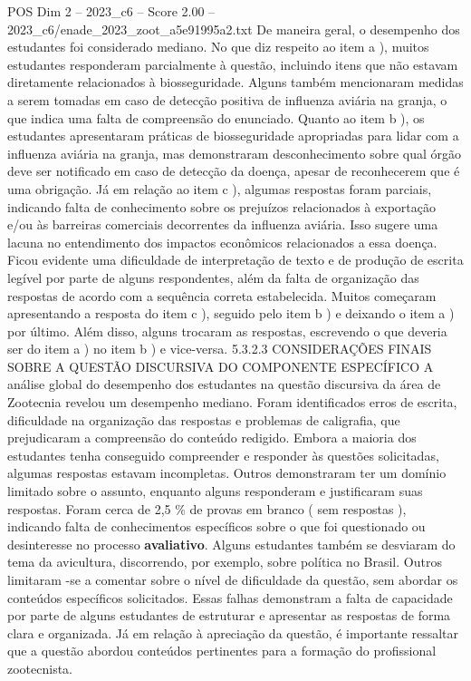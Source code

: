 \begin{textsample}{POS Dim 2 – 2023\_c6 – Score 2.00 – 2023\_c6/enade\_2023\_zoot\_a5e91995a2.txt}
De maneira geral, o desempenho dos estudantes foi considerado mediano.
No que diz respeito ao item a ), muitos estudantes responderam parcialmente à questão, incluindo itens que não estavam diretamente relacionados à biosseguridade.
Alguns também mencionaram medidas a serem tomadas em caso de detecção positiva de influenza aviária na granja, o que indica uma falta de compreensão do enunciado.
Quanto ao item b ), os estudantes apresentaram práticas de biosseguridade apropriadas para lidar com a influenza aviária na granja, mas demonstraram desconhecimento sobre qual órgão deve ser notificado em caso de detecção da doença, apesar de reconhecerem que é uma obrigação.
Já em relação ao item c ), algumas respostas foram parciais, indicando falta de conhecimento sobre os prejuízos relacionados à exportação e/ou às barreiras comerciais decorrentes da influenza aviária.
Isso sugere uma lacuna no entendimento dos impactos econômicos relacionados a essa doença.
Ficou evidente uma dificuldade de interpretação de texto e de produção de escrita legível por parte de alguns respondentes, além da falta de organização das respostas de acordo com a sequência correta estabelecida.
Muitos começaram apresentando a resposta do item c ), seguido pelo item b ) e deixando o item a ) por último.
Além disso, alguns trocaram as respostas, escrevendo o que deveria ser do item a ) no item b ) e vice-versa. 5.3.2.3 CONSIDERAÇÕES FINAIS SOBRE A QUESTÃO DISCURSIVA DO COMPONENTE ESPECÍFICO A análise global do desempenho dos estudantes na questão discursiva da área de Zootecnia revelou um desempenho mediano.
Foram identificados erros de escrita, dificuldade na organização das respostas e problemas de caligrafia, que prejudicaram a compreensão do conteúdo redigido.
Embora a maioria dos estudantes tenha conseguido compreender e responder às questões solicitadas, algumas respostas estavam incompletas.
Outros demonstraram ter um domínio limitado sobre o assunto, enquanto alguns responderam e justificaram suas respostas.
Foram cerca de 2,5 \% de provas em branco ( sem respostas ), indicando falta de conhecimentos específicos sobre o que foi questionado ou desinteresse no processo \textbf{avaliativo}.
Alguns estudantes também se desviaram do tema da avicultura, discorrendo, por exemplo, sobre política no Brasil.
Outros limitaram -se a comentar sobre o nível de dificuldade da questão, sem abordar os conteúdos específicos solicitados.
Essas falhas demonstram a falta de capacidade por parte de alguns estudantes de estruturar e apresentar as respostas de forma clara e organizada.
Já em relação à apreciação da questão, é importante ressaltar que a questão abordou conteúdos pertinentes para a formação do profissional zootecnista.

\end{textsample}
